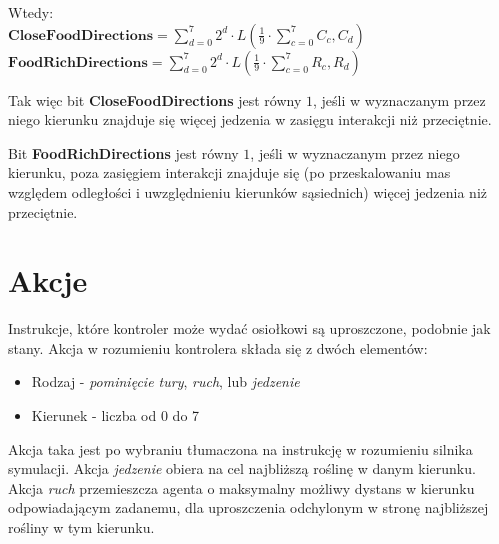 Wtedy:
\\$\textbf{CloseFoodDirections} = \sum_{d=0}^{7} 2^{d} \cdot L(\frac{1}{9}\cdot\sum_{c=0}^{7} C_{c},C_{d})$
\\$\textbf{FoodRichDirections} = \sum_{d=0}^{7} 2^{d} \cdot L(\frac{1}{9}\cdot\sum_{c=0}^{7} R_{c},R_{d})$

Tak więc bit \textbf{CloseFoodDirections} jest równy $1$, jeśli w wyznaczanym przez niego kierunku znajduje się więcej jedzenia w zasięgu interakcji niż przeciętnie. 

Bit \textbf{FoodRichDirections} jest równy $1$, jeśli w wyznaczanym przez niego kierunku, poza zasięgiem interakcji znajduje się (po przeskalowaniu mas względem odległości i uwzględnieniu kierunków sąsiednich) więcej jedzenia niż przeciętnie.

\section{Akcje}
Instrukcje, które kontroler może wydać osiołkowi są uproszczone, podobnie jak stany. Akcja w rozumieniu kontrolera składa się z dwóch elementów:
\begin{itemize}
    \item Rodzaj - \textit{pominięcie tury}, \textit{ruch},  lub \textit{jedzenie}
    \item Kierunek - liczba od 0 do 7
\end{itemize}

Akcja taka jest po wybraniu tłumaczona na instrukcję w rozumieniu silnika symulacji. Akcja \textit{jedzenie} obiera na cel najbliższą roślinę w danym kierunku. Akcja \textit{ruch} przemieszcza agenta o maksymalny możliwy dystans w kierunku odpowiadającym zadanemu, dla uproszczenia odchylonym w stronę najbliższej rośliny w tym kierunku.

